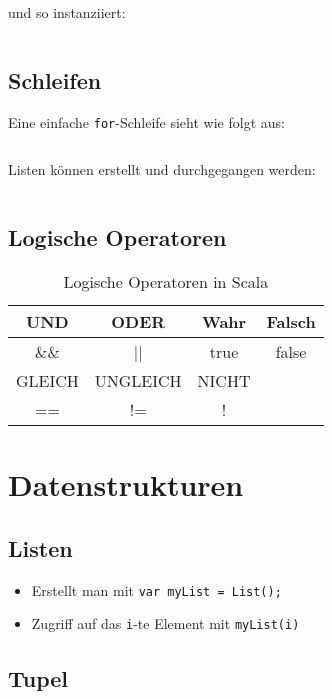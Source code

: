 und so instanziiert:
\inputminted[numbersep=5pt, tabsize=4]{scala}{scripts/scala/simple-class-instanciation.scala}

\subsection{Schleifen}
Eine einfache \texttt{for}-Schleife sieht wie folgt aus:

\inputminted[numbersep=5pt, tabsize=4]{scala}{scripts/scala/extended-for.scala}

Listen können erstellt und durchgegangen werden:

\inputminted[numbersep=5pt, tabsize=4]{scala}{scripts/scala/extended-for.scala}

\subsection{Logische Operatoren}
\begin{table}[H]
    \centering
    \begin{tabular}{CCCC}
    UND    & ODER     & Wahr  & Falsch \\ \hline\hline
    \&\&   & ||       & true  & false \\[4ex]
    GLEICH & UNGLEICH & NICHT & ~     \\ \hline\hline
    ==     & !=       & !     & ~     \\
    \end{tabular}
    \caption{Logische Operatoren in Scala}
\end{table}

\section{Datenstrukturen}
\subsection{Listen}

\begin{itemize}
    \item Erstellt man mit \verb+var myList = List();+
    \item Zugriff auf das \verb+i+-te Element mit \verb+myList(i)+
\end{itemize}

\subsection{Tupel}

